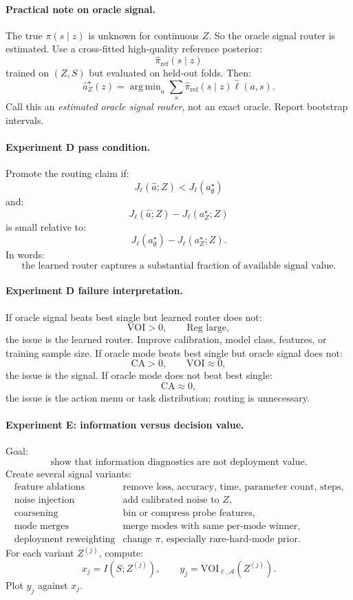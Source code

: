 \documentclass{article}
\DeclareMathOperator*{\argmin}{arg\,min}
\begin{document}
\paragraph{Practical note on oracle signal.}
The true \(\pi(s\mid z)\) is unknown for continuous \(Z\).
So the oracle signal router is estimated.
Use a cross-fitted high-quality reference posterior:
\[
    \hat \pi_{\mathrm{ref}}(s\mid z)
\]
trained on \((Z,S)\) but evaluated on held-out folds.
Then:
\[
    \hat a_Z^\star(z)
    =
    \argmin_a\sum_s\hat\pi_{\mathrm{ref}}(s\mid z)\hat\ell(a,s).
\]
Call this an \emph{estimated oracle signal router}, not an exact oracle.
Report bootstrap intervals.

\paragraph{Experiment D pass condition.}
Promote the routing claim if:
\[
    J_\ell(\hat a;Z)<J_\ell(a^\star_{\emptyset})
\]
and:
\[
    J_\ell(\hat a;Z)-J_\ell(a^\star_Z;Z)
\]
is small relative to:
\[
    J_\ell(a^\star_{\emptyset})-J_\ell(a^\star_Z;Z).
\]
In words:
\[
    \text{the learned router captures a substantial fraction of available signal value.}
\]

\paragraph{Experiment D failure interpretation.}
If oracle signal beats best single but learned router does not:
\[
    \mathrm{VOI}>0,
    \qquad
    \mathrm{Reg}\text{ large},
\]
the issue is the learned router.
Improve calibration, model class, features, or training sample size.
If oracle mode beats best single but oracle signal does not:
\[
    \mathrm{CA}>0,
    \qquad
    \mathrm{VOI}\approx 0,
\]
the issue is the signal.
If oracle mode does not beat best single:
\[
    \mathrm{CA}\approx 0,
\]
the issue is the action menu or task distribution; routing is unnecessary.

\paragraph{Experiment E: information versus decision value.}
Goal:
\[
    \text{show that information diagnostics are not deployment value.}
\]
Create several signal variants:
\[
\begin{array}{ll}
    \text{feature ablations} & \text{remove loss, accuracy, time, parameter count, steps},\\
    \text{noise injection} & \text{add calibrated noise to \(Z\)},\\
    \text{coarsening} & \text{bin or compress probe features},\\
    \text{mode merges} & \text{merge modes with same per-mode winner},\\
    \text{deployment reweighting} & \text{change \(\pi\), especially rare-hard-mode prior}.
\end{array}
\]
For each variant \(Z^{(j)}\), compute:
\[
    x_j=I(S;Z^{(j)}),
    \qquad
    y_j=\mathrm{VOI}_{\ell,\mathcal A}(Z^{(j)}).
\]
Plot \(y_j\) against \(x_j\).
\end{document}
